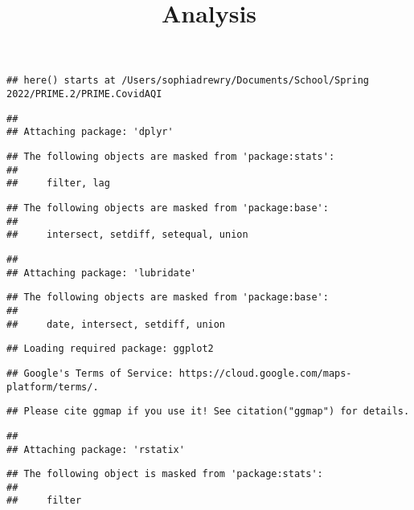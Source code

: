 \documentclass[
]{article}
\title{Analysis}
\author{}
\date{\vspace{-2.5em}}
\begin{document}
\maketitle

\begin{verbatim}
## here() starts at /Users/sophiadrewry/Documents/School/Spring 2022/PRIME.2/PRIME.CovidAQI
\end{verbatim}

\begin{verbatim}
## 
## Attaching package: 'dplyr'
\end{verbatim}

\begin{verbatim}
## The following objects are masked from 'package:stats':
## 
##     filter, lag
\end{verbatim}

\begin{verbatim}
## The following objects are masked from 'package:base':
## 
##     intersect, setdiff, setequal, union
\end{verbatim}

\begin{verbatim}
## 
## Attaching package: 'lubridate'
\end{verbatim}

\begin{verbatim}
## The following objects are masked from 'package:base':
## 
##     date, intersect, setdiff, union
\end{verbatim}

\begin{verbatim}
## Loading required package: ggplot2
\end{verbatim}

\begin{verbatim}
## Google's Terms of Service: https://cloud.google.com/maps-platform/terms/.
\end{verbatim}

\begin{verbatim}
## Please cite ggmap if you use it! See citation("ggmap") for details.
\end{verbatim}

\begin{verbatim}
## 
## Attaching package: 'rstatix'
\end{verbatim}

\begin{verbatim}
## The following object is masked from 'package:stats':
## 
##     filter
\end{verbatim}
\end{document}
